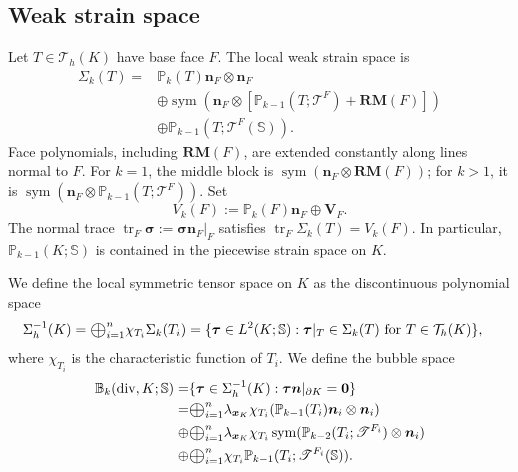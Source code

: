 \documentclass[review,hidelinks,onefignum,onetabnum]{siamart251216}
\renewcommand{\div}{\operatorname{div}}
\newcommand{\Oplus}{\ensuremath{\vcenter{\hbox{\scalebox{1.5}{$\oplus$}}}}}
\newcommand{\tr}{\operatorname{tr}}
\newcommand{\sym}{\operatorname{sym}}
\begin{document}
\subsection{Weak strain space}
Let $T\in\mathcal T_h(K)$ have base face $F$.
The local weak strain space is
\begin{equation}\label{eq:strainspace}
\begin{aligned}
\Sigma_k(T)={}&\mathbb P_k(T)\boldsymbol n_F\otimes\boldsymbol n_F\\
&\oplus\sym\!\left(\boldsymbol n_F\otimes
  [\mathbb P_{k-1}(T;\mathscr T^F)+\mathbf{RM}(F)]\right)\\
&\oplus\mathbb P_{k-1}(T;\mathscr T^F(\mathbb S)).
\end{aligned}
\end{equation}
Face polynomials, including $\mathbf{RM}(F)$, are extended constantly along
lines normal to $F$. For $k=1$, the middle block is
$\sym(\boldsymbol n_F\otimes\mathbf{RM}(F))$; for $k>1$, it is
$\sym(\boldsymbol n_F\otimes\mathbb P_{k-1}(T;\mathscr T^F))$.
Set
\[
V_k(F):=\mathbb P_k(F)\boldsymbol n_F\oplus\boldsymbol V_F.
\]
The normal trace $\tr_F\boldsymbol\sigma:=\boldsymbol\sigma\boldsymbol n_F|_F$
satisfies $\tr_F\Sigma_k(T)=V_k(F)$. In particular,
$\mathbb P_{k-1}(K;\mathbb S)$ is contained in the piecewise strain space on $K$.

We define the local symmetric tensor space on $K$ as the discontinuous polynomial space
\begin{align}\label{eq:202411132}
\Sigma_h^{-1}(K)&=\Oplus_{i=1}^n\chi_{T_i}\Sigma_k(T_i)=\{\boldsymbol{\tau}\in L^2(K;\mathbb S): \boldsymbol{\tau}|_T\in \Sigma_k(T) \textrm{ for }T\in\mathcal{T}_h(K)\},
\end{align}
where $\chi_{T_i}$ is the characteristic function of $T_i$. We  define the bubble space
\begin{equation}\label{eq:bubblespace}
\begin{aligned}
\mathbb{B}_k(\div,K;\mathbb{S})=&\{\boldsymbol{\tau}\in \Sigma_h^{-1}(K): \boldsymbol{\tau}\boldsymbol{n}|_{\partial K}=\boldsymbol{0}\}\\
=&\Oplus_{i=1}^n\lambda_{\boldsymbol{x}_K}\chi_{T_i}(\mathbb{P}_{k-1}(T_i)\boldsymbol{n}_i\otimes\boldsymbol{n}_i) \\
\oplus
&\Oplus_{i=1}^n\lambda_{\boldsymbol{x}_K}\chi_{T_i}\sym(\mathbb{P}_{k-2}(T_i; \mathscr T^{F_i})\otimes\boldsymbol{n}_i) \\
\oplus
&\Oplus_{i=1}^n\chi_{T_i}\mathbb{P}_{k-1}(T_i;\mathscr T^{F_i}(\mathbb S)).
\end{aligned}
\end{equation}
\end{document}
